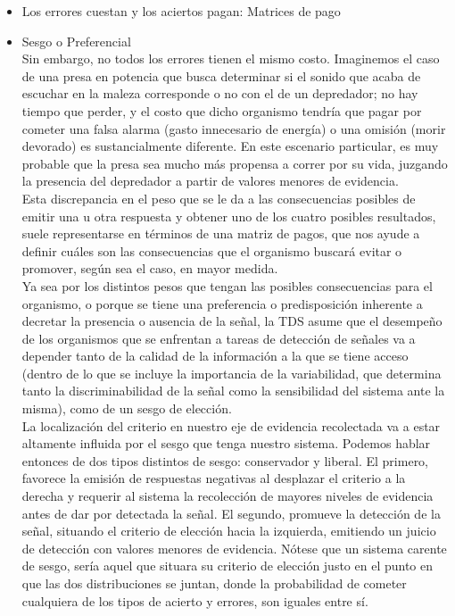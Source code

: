 \begin{itemize}
    \begin{itemize}
      \item{Los errores cuestan y los aciertos pagan: Matrices de pago}\\

      \item{Sesgo o Preferencial}\\

 Sin embargo, no todos los errores tienen el mismo costo. Imaginemos el caso de una presa en potencia que busca determinar si el sonido que acaba de escuchar en la maleza corresponde o no con el de un depredador; no hay tiempo que perder, y el costo que dicho organismo tendría que pagar por cometer una falsa alarma (gasto innecesario de energía) o una omisión (morir devorado) es sustancialmente diferente. En este escenario particular, es muy probable que la presa sea mucho más propensa a correr por su vida, juzgando la presencia del depredador a partir de valores menores de evidencia.\\

Esta discrepancia en el peso que se le da a las consecuencias posibles de emitir una u otra respuesta y obtener uno de los cuatro posibles resultados, suele representarse en términos de una matriz de pagos, que nos ayude a definir cuáles son las consecuencias que el organismo buscará evitar o promover, según sea el caso, en mayor medida.\\

Ya sea por los distintos pesos que tengan las posibles consecuencias para el organismo, o porque se tiene una preferencia o predisposición inherente a decretar la presencia o ausencia de la señal, la TDS asume que el desempeño de los organismos que se enfrentan a tareas de detección de señales va a depender tanto de la calidad de la información a la que se tiene acceso (dentro de lo que se incluye la importancia de la variabilidad, que determina tanto la discriminabilidad de la señal como la sensibilidad del sistema ante la misma), como de un sesgo de elección.\\

La localización del criterio en nuestro eje de evidencia recolectada va a estar altamente influida por el sesgo que tenga nuestro sistema. Podemos hablar entonces de dos tipos distintos de sesgo: conservador y liberal. El primero, favorece la emisión de respuestas negativas al desplazar el criterio a la derecha y requerir al sistema la recolección de mayores niveles de evidencia antes de dar por detectada la señal. El segundo, promueve la detección de la señal, situando el criterio de elección hacia la izquierda, emitiendo un juicio de detección con valores menores de evidencia. Nótese que un sistema carente de sesgo, sería aquel que situara su criterio de elección justo en el punto en que las dos distribuciones se juntan, donde la probabilidad de cometer cualquiera de los tipos de acierto y errores, son iguales entre sí.\\


\end{itemize}
\end{itemize}
